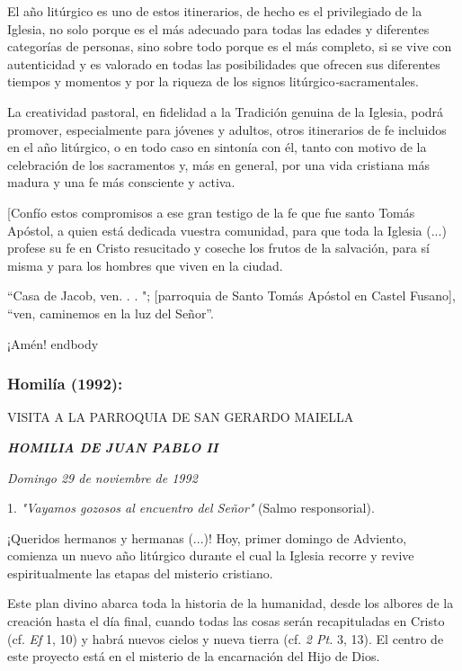 \begin{body}
El año litúrgico es uno de estos itinerarios, de hecho es el privilegiado de la Iglesia, no solo porque es el más adecuado para todas las edades y diferentes categorías de personas, sino sobre todo porque es el más completo, si se vive con autenticidad y es valorado en todas las posibilidades que ofrecen sus diferentes tiempos y momentos y por la riqueza de los signos litúrgico\emph{-}sacramentales.

La creatividad pastoral, en fidelidad a la Tradición genuina de la Iglesia, podrá promover, especialmente para jóvenes y adultos, otros itinerarios de fe incluidos en el año litúrgico, o en todo caso en sintonía con él, tanto con motivo de la celebración de los sacramentos y, más en general, por una vida cristiana más madura y una fe más consciente y activa.

{[}Confío estos compromisos a ese gran testigo de la fe que fue santo Tomás Apóstol, a quien está dedicada vuestra comunidad, para que toda la Iglesia (...) profese su fe en Cristo resucitado y coseche los frutos de la salvación, para sí misma y para los hombres que viven en la ciudad.

``Casa de Jacob, ven. . . "; {[}parroquia de Santo Tomás Apóstol en Castel Fusano{]}, ``ven, caminemos en la luz del Señor''.

¡Amén!
end{body} 

\subsubsection{Homilía (1992): }

VISITA A LA PARROQUIA DE SAN GERARDO MAIELLA

\emph{\textbf{HOMILIA DE JUAN PABLO II}}

\emph{Domingo 29 de noviembre de 1992}

\begin{body} 
1. \emph{"Vayamos gozosos al encuentro del Señor"} (Salmo responsorial).

¡Queridos hermanos y hermanas (...)! Hoy, primer domingo de Adviento, comienza un nuevo año litúrgico durante el cual la Iglesia recorre y revive espiritualmente las etapas del misterio cristiano.

Este plan divino abarca toda la historia de la humanidad, desde los albores de la creación hasta el día final, cuando todas las cosas serán recapituladas en Cristo (cf. \emph{Ef} 1, 10) y habrá nuevos cielos y nueva tierra (cf. \emph{2 Pt.} 3, 13). El centro de este proyecto está en el misterio de la encarnación del Hijo de Dios.


\end{body}
\end{body}

